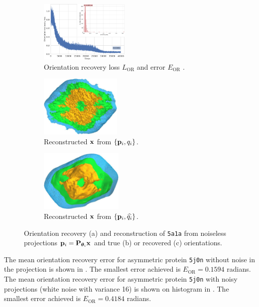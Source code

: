 \begin{figure}[t]
    \centering
    \begin{subfigure}[b]{0.42\textwidth}
        \centering
        \includegraphics[width=\linewidth,height=8em]{figures/5a1a_noise0_ar_aa}
        \caption{%
            Orientation recovery loss $L_\text{OR}$  and error $E_\text{OR}$ .
        }\label{fig:5a1a-noise0-orientation-recovery}
    \end{subfigure}
    \hfill
    \begin{subfigure}[b]{0.27\linewidth}
        \centering
        \includegraphics[height=8em]{figures/5a1a_ground_truth}
        \caption{Reconstructed $\mathbf{x}$ from $\{ \mathbf{p}_i, q_i \}$.}
    \end{subfigure}
    \hfill
    \begin{subfigure}[b]{0.27\linewidth}
        \centering
        \includegraphics[height=8em]{figures/5a1a_aligned}
        \caption{Reconstructed $\mathbf{x}$ from $\{ \mathbf{p}_i, \widehat{q_i} \}$.}
    \end{subfigure}
    \caption{%
        Orientation recovery (a) and reconstruction of \texttt{5a1a} from noiseless projections $\mathbf{p}_i = \mathbf{P}_{{\boldsymbol{\theta}}_i} \mathbf{x}$ and true (b) or recovered (c) orientations.
    }\label{fig:5a1a-noise0-reconstruction}
\end{figure}

The mean orientation recovery error for asymmetric protein \texttt{5j0n} without noise in the projection is shown in .
The smallest error achieved is $E_\text{OR} = 0.1594$ radians.
The mean orientation recovery error for asymmetric protein \texttt{5j0n} with noisy projections (white noise with variance 16) is shown on histogram in .
The smallest error achieved is $E_\text{OR} = 0.4184$ radians.

